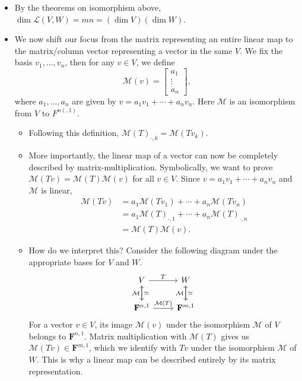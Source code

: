 \documentclass[11pt]{article}
\newcommand{\F}{\mathbf{F}}
\renewcommand{\d}{\dim}
\newcommand{\LVW}{\mathcal{L}(V,W)}
\newcommand{\M}{\mathcal{M}}
\newcommand{\bv}{v_1,\dots,v_n}
\begin{document}
\begin{itemize}
\begin{itemize}
    \end{itemize}
    \item By the theorems on isomorphism above, $\d \LVW = mn = (\d V) (\d W)$.
    \item We now shift our focus from the matrix representing an entire linear map to the matrix/column vector representing a vector in the same $V$. We fix the basis $\bv$, then for any $v \in V$, we define
    \begin{equation*}
        \M(v) = 
        \begin{bmatrix}
            a_1 \\ \vdots \\ a_n
        \end{bmatrix},
    \end{equation*}
    where $a_1,\dots,a_n$ are given by $v = a_1v_1+\cdots+a_nv_n$. Here $\M$ is an isomorphism from $V$ to $F^{n(, 1)}$.
    \begin{itemize}
        \item Following this definition, $\M(T)_{\cdot,k} = \M(Tv_k)$.
        \item More importantly, the linear map of a vector can now be completely described by matrix-multiplication. Symbolically, we want to prove $\M(Tv) = \M(T)\M(v)$ for all $v \in V$. Since $v = a_1v_1 + \cdots +a_nv_n$ and $\M$ is linear,
        \begin{align*}
            \M(Tv) & = a_1\M(Tv_1) + \cdots + a_n \M(Tv_n) \\ & = a_1\M(T)_{\cdot, 1} + \cdots + a_n\M(T)_{\cdot, n} \\ & = \M(T)\M(v).
        \end{align*}
        \item How do we interpret this? Consider the following diagram under the appropriate bases for $V$ and $W$.
        \begin{equation*}
            \begin{tikzcd}
            V \arrow[r,"T"] \arrow[d,"\simeq"]& W \arrow[d,"\simeq"] \\
            \F^{n,1} \arrow[r,"\M(T)"] \arrow[u,"\M"] & \F^{m,1} \arrow[u,"\M"]
            \end{tikzcd}
        \end{equation*}
        For a vector $v \in V$, its image $\M(v)$ under the isomorphism $\M$ of $V$ belongs to $\F^{n,1}$. Matrix multiplication with $\M(T)$ gives us $\M(Tv) \in \F^{m,1}$, which we identify with $Tv$ under the isomorphism $\M$ of $W$. This is why a linear map can be described entirely by its matrix representation.

\end{itemize}
\end{itemize}
\end{document}
